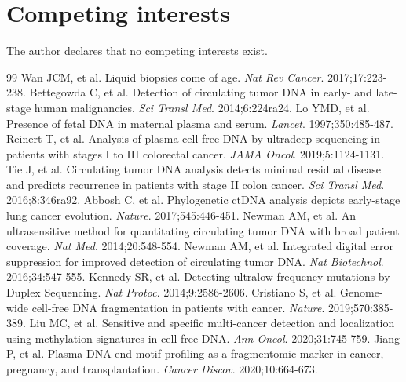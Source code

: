 \documentclass[11pt]{article}
\begin{document}
\section*{Competing interests}
The author declares that no competing interests exist.

\begin{thebibliography}{99}
 Wan JCM, et al. Liquid biopsies come of age. \emph{Nat Rev Cancer}. 2017;17:223-238.
 Bettegowda C, et al. Detection of circulating tumor DNA in early- and late-stage human malignancies. \emph{Sci Transl Med}. 2014;6:224ra24.
 Lo YMD, et al. Presence of fetal DNA in maternal plasma and serum. \emph{Lancet}. 1997;350:485-487.
 Reinert T, et al. Analysis of plasma cell-free DNA by ultradeep sequencing in patients with stages I to III colorectal cancer. \emph{JAMA Oncol}. 2019;5:1124-1131.
 Tie J, et al. Circulating tumor DNA analysis detects minimal residual disease and predicts recurrence in patients with stage II colon cancer. \emph{Sci Transl Med}. 2016;8:346ra92.
 Abbosh C, et al. Phylogenetic ctDNA analysis depicts early-stage lung cancer evolution. \emph{Nature}. 2017;545:446-451.
 Newman AM, et al. An ultrasensitive method for quantitating circulating tumor DNA with broad patient coverage. \emph{Nat Med}. 2014;20:548-554.
 Newman AM, et al. Integrated digital error suppression for improved detection of circulating tumor DNA. \emph{Nat Biotechnol}. 2016;34:547-555.
 Kennedy SR, et al. Detecting ultralow-frequency mutations by Duplex Sequencing. \emph{Nat Protoc}. 2014;9:2586-2606.
 Cristiano S, et al. Genome-wide cell-free DNA fragmentation in patients with cancer. \emph{Nature}. 2019;570:385-389.
 Liu MC, et al. Sensitive and specific multi-cancer detection and localization using methylation signatures in cell-free DNA. \emph{Ann Oncol}. 2020;31:745-759.
 Jiang P, et al. Plasma DNA end-motif profiling as a fragmentomic marker in cancer, pregnancy, and transplantation. \emph{Cancer Discov}. 2020;10:664-673.
\end{thebibliography}
\end{document}
